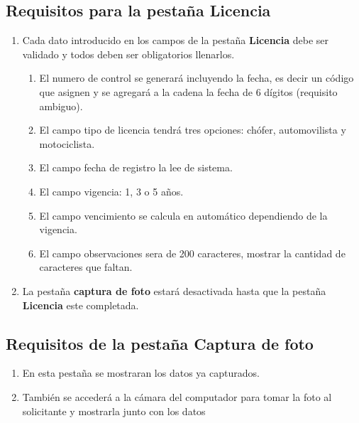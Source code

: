 		\subsection{Requisitos para la pestaña Licencia}
		\begin{enumerate}
			\item Cada dato introducido en los campos de la pestaña \textbf{Licencia} debe ser validado y todos deben ser obligatorios llenarlos.
				\begin{enumerate}[a]
					\item El numero de control se generará incluyendo la fecha, es decir un código que asignen y se agregará a la cadena la fecha de 6 dígitos (requisito ambiguo).
					\item El campo tipo de licencia tendrá tres opciones: chófer, automovilista y motociclista.
					\item El campo fecha de registro la lee de sistema.
					\item El campo vigencia: 1, 3 o 5 años.
					\item El campo vencimiento se calcula en automático dependiendo de la vigencia.
					\item El campo observaciones sera de 200 caracteres, mostrar la cantidad de caracteres que faltan.
				\end{enumerate}
			\item La pestaña \textbf{captura de foto} estará desactivada hasta que la pestaña \textbf{Licencia} este completada.
		\end{enumerate}
		
		\subsection{Requisitos de la pestaña Captura de foto}
			\begin{enumerate}
				\item En esta pestaña se mostraran los datos ya capturados.
				\item También se accederá a la cámara del computador para tomar la foto al solicitante y mostrarla junto con los datos
			\end{enumerate}
